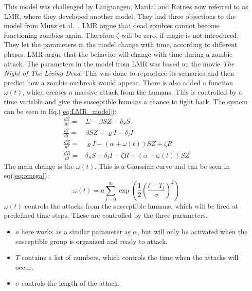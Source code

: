 \documentclass[%
twoside,                 %
final,                   %
chapterprefix=true,      %
open=right               %
10pt]{book}
\begin{document}
This model was challenged by Langtangen, Mardal and Røtnes \cite{zombie-math} now referred to as LMR, where they developed another model. They had three objections to the model from Munz et al.~\cite{munz2009zombies}. LMR argue that dead zombies cannot become functioning zombies again. Therefore $\zeta$ will be zero, if magic is not introduced. They let the parameters in the model change with time, according to different phases. LMR argue that the behavior will change with time during a zombie attack. The parameters in the model from LMR was based on the movie \emph{The Night of The Living Dead}. This was done to reproduce its scenarios and then predict how a zombie outbreak would appear. There is also added a function $\omega(t)$, which creates a massive attack from the humans. This is controlled by a time variable and give the susceptible humans a chance to fight back. The system can be seen in Eq.(\ref{eq:LMR_model}):
\begin{equation} \label{eq:LMR_model}
	\begin{aligned} 
	\frac{dS}{dt} =& \Sigma -\beta SZ - \delta_SS \\
	\frac{dI}{dt} =& \beta SZ - \varrho I - \delta_II\\
	\frac{dZ}{dt} =& \varrho I- (\alpha+\omega(t))SZ + \zeta R\\
	\frac{dR}{dt} =& \delta_SS +\delta_II -\zeta R + (\alpha+\omega(t))SZ 
	\end{aligned}
\end{equation}
The main change is the $\omega(t)$. This is a Gaussian curve and can be seen in eq(\ref{eq:omega}).
\begin{equation} \label{eq:omega}
\omega(t) = a \sum^m_{i=0}\exp\left(\frac{1}{2}\left(\frac{t-T_i}{\sigma}\right)^2\right)
\end{equation}
$\omega(t)$ controls the attacks from the susceptible humans, which will be fired at predefined time steps. These are controlled by the three parameters. 
\begin{itemize}
\item $a$ here works as a similar parameter as $\alpha$, but will only be activated when the susceptible group is organized and ready to attack. 

\item $T$ contains a list of numbers, which controls the time when the attacks will occur.

\item $\sigma$ controls the length of the attack. 
\end{itemize}
\end{document}
